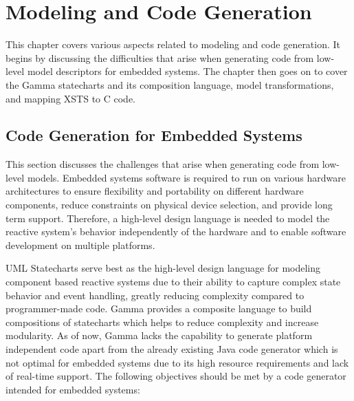 \chapter{Modeling and Code Generation}

This chapter covers various aspects related to modeling and code generation. It begins by discussing the difficulties that arise when generating code from low-level model descriptors for embedded systems. The chapter then goes on to cover the Gamma statecharts and its composition language, model transformations, and mapping XSTS to C code.

\section{Code Generation for Embedded Systems}

This section discusses the challenges that arise when generating code from low-level models. Embedded systems \cite{Embedded} software is required to run on various hardware architectures to ensure flexibility and portability on different hardware components, reduce constraints on physical device selection, and provide long term support. Therefore, a high-level design language is needed to model the reactive system's behavior independently of the hardware and to enable software development on multiple platforms. 

UML Statecharts \cite{UMLState} serve best as the high-level design language for modeling component based reactive systems due to their ability to capture complex state behavior and event handling, greatly reducing complexity compared to programmer-made code. Gamma provides a composite language to build compositions of statecharts which helps to reduce complexity and increase modularity. As of now, Gamma lacks the capability to generate platform independent code apart from the already existing Java code generator which is not optimal for embedded systems due to its high resource requirements and lack of real-time support. The following objectives should be met by a code generator intended for embedded systems:

